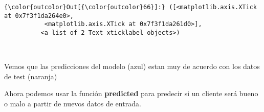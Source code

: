 \documentclass[11pt]{article}
\begin{document}
\begin{Verbatim}[commandchars=\\\{\}]
{\color{outcolor}Out[{\color{outcolor}66}]:} ([<matplotlib.axis.XTick at 0x7f3f1da264e0>,
           <matplotlib.axis.XTick at 0x7f3f1da261d0>],
          <a list of 2 Text xticklabel objects>)
\end{Verbatim}
            
    \begin{center}
    \end{center}
    { \hspace*{\fill} \\}
    
    Vemos que las predicciones del modelo (azul) estan muy de acuerdo con
los datos de test (naranja)

    Ahora podemos usar la función \textbf{predicted} para predecir si un
cliente será bueno o malo a partir de nuevos datos de entrada.


    
    
    
    
\end{document}
